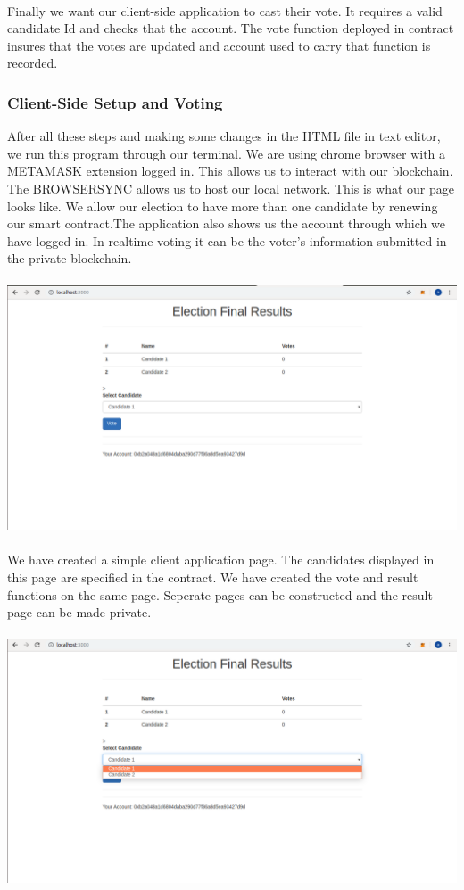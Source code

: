\documentclass{report}
\begin{document}
\\
Finally we want our client-side application to cast their vote. It requires a valid candidate Id and checks that the account. The vote function deployed in contract insures that the votes are updated and account used to carry that function is recorded.

\subsubsection{Client-Side Setup and Voting}
 After all these steps and making some changes in the HTML file in text editor, we run this program through our terminal. We are using chrome browser with a METAMASK extension logged in. This allows us to interact with our blockchain. The BROWSERSYNC allows us to host our local network. This is what our page looks like. We allow our election to have more than one candidate by renewing our smart contract.The application also shows us the account through which we have logged in. In realtime voting it can be the voter's information submitted in the private blockchain.
 \\
 \\
 \includegraphics[scale=0.45]{chrome1.png}
 \\
 \\
 We have created a simple client application page. The candidates displayed in this page are specified in the contract. We have created the vote and result functions on the same page. Seperate pages can be constructed and the result page can be made private.
 \\
 \\
 \includegraphics[scale=0.45]{chrome2.png}
\end{document}
